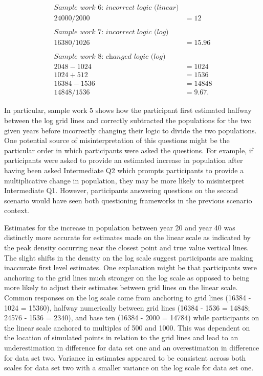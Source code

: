 \documentclass[print]{nuthesis}
\begin{document}
\begin{align}
\textit{Sample work 6: incorrect logic (linear)} \nonumber\\
24000/2000&=12 \nonumber\\
\nonumber \\ 
\textit{Sample work 7: incorrect logic (log)} \nonumber\\
16380/1026&=15.96\nonumber\\
\nonumber \\ 
\textit{Sample work 8: changed logic (log)} \nonumber\\
2048-1024&=1024\nonumber\\
1024+512&=1536\nonumber\\
16384-1536&=14848\nonumber\\
14848/1536&=9.67.\nonumber
\end{align}

In particular, sample work 5 shows how the participant first estimated halfway between the log grid lines and correctly subtracted the populations for the two given years before incorrectly changing their logic to divide the two populations.
One potential source of misinterpretation of this questions might be the particular order in which participants were asked the questions.
For example, if participants were asked to provide an estimated increase in population after having been asked Intermediate Q2 which prompts participants to provide a multiplicative change in population, they may be more likely to misinterpret Intermediate Q1.
However, participants answering questions on the second scenario would have seen both questioning frameworks in the previous scenario context.

Estimates for the increase in population between year 20 and year 40 was distinctly more accurate for estimates made on the linear scale as indicated by the peak density occurring near the closest point and true value vertical lines.
The slight shifts in the density on the log scale suggest participants are making inaccurate first level estimates.
One explanation might be that participants were anchoring to the grid lines much stronger on the log scale as opposed to being more likely to adjust their estimates between grid lines on the linear scale.
Common responses  on the log scale come from anchoring to grid lines (16384 - 1024 = 15360), halfway numerically between grid lines (16384 - 1536 = 14848; 24576 - 1536 = 2340), and base ten (16384 - 2000 = 14784) while participants on the linear scale anchored to multiples of 500 and 1000.
This was dependent on the location of simulated points in relation to the grid lines and lead to an underestimation in difference for data set one and an overestimation in difference for data set two.
Variance in estimates appeared to be consistent across both scales for data set two with a smaller variance on the log scale for data set one.
\end{document}
